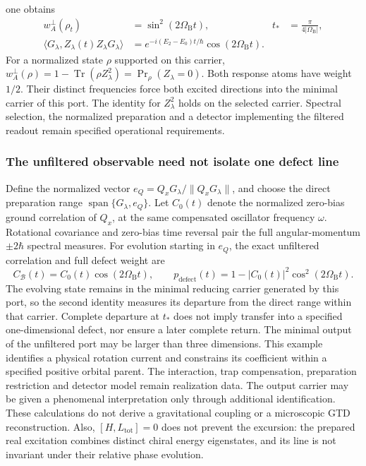 \documentclass[11pt,reqno]{scrartcl}
\newcommand{\inner}[2]{\langle #1,#2\rangle}
\DeclareMathOperator{\Span}{span}
\DeclareMathOperator{\Tr}{Tr}
\newcommand{\defectWeight}{w_{A}^{\perp}}
\theoremstyle{plain}
\theoremstyle{definition}
\theoremstyle{remark}
\begin{document}
one obtains
\begin{align}
 \defectWeight(\rho_t)&=\sin^2(2\Omega_{\mathrm B}t),
 &t_*&=\frac{\pi}{4|\Omega_{\mathrm B}|},\\
 \inner{G_\lambda}{Z_\lambda(t)Z_\lambda G_\lambda}
 &=e^{-i(E_2-E_0)t/\hbar}\cos(2\Omega_{\mathrm B}t).
 \label{eq:orbital-low-response}
\end{align}
For a normalized state $\rho$ supported on this carrier,
$\defectWeight(\rho)=1-\Tr(\rho Z_\lambda^2)=\Pr_\rho(Z_\lambda=0)$.
Both response atoms have weight \(1/2\).  Their distinct frequencies
force both excited directions into the minimal carrier of this port.
The identity for \(Z_\lambda^2\) holds on the selected carrier.  Spectral
selection, the normalized preparation and a detector implementing the
filtered readout remain specified operational requirements.

\subsubsection*{The unfiltered observable need not isolate one defect line}
Define the normalized vector
\(e_Q=Q_xG_\lambda/\|Q_xG_\lambda\|\), and choose the direct preparation
range \(\Span\{G_\lambda,e_Q\}\).  Let \(C_0(t)\) denote the normalized
zero-bias ground correlation of \(Q_x\), at the same compensated
oscillator frequency \(\omega\).  Rotational covariance and zero-bias
time reversal pair the full angular-momentum \(\pm2\hbar\) spectral
measures.  For evolution starting in $e_Q$, the exact unfiltered correlation
and full defect weight are
\begin{equation}
 C_{\mathcal B}(t)=C_0(t)\cos(2\Omega_{\mathrm B}t),\qquad
 p_{\mathrm{defect}}(t)=1-|C_0(t)|^2\cos^2(2\Omega_{\mathrm B}t).
 \label{eq:orbital-unfiltered-response}
\end{equation}
The evolving state remains in the minimal reducing carrier generated by
this port, so the second identity measures its departure from the direct
range within that carrier.  Complete departure at \(t_*\) does not imply
transfer into a specified one-dimensional defect, nor ensure a later
complete return.  The minimal output of the unfiltered port may be larger
than three dimensions.  
This example identifies a physical rotation current and constrains its
coefficient within a specified positive orbital parent.  The interaction,
trap compensation, preparation restriction and detector model remain
realization data.  The output carrier may be given a phenomenal interpretation only
through additional identification.  These calculations do not derive
a gravitational coupling or a microscopic GTD reconstruction.  Also, \([H,L_{\mathrm{tot}}]=0\) does not prevent the
excursion: the prepared real excitation combines distinct chiral energy
eigenstates, and its line is not invariant under their relative phase
evolution.
\end{document}

